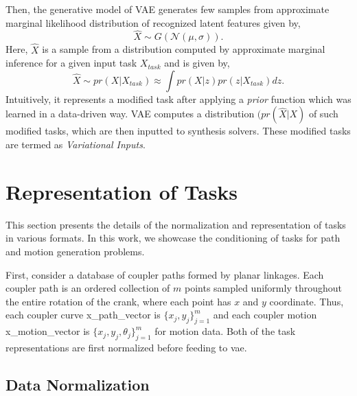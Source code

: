 Then, the generative model of VAE generates few samples from approximate marginal likelihood distribution of recognized latent features given by,
\begin{equation}
  \hat{X} \sim G(\mathcal{N}(\mu, \sigma)).
\end{equation}
Here, $\hat{X}$ is a sample from a distribution computed by approximate marginal inference for a given input task $X_{task}$ and is given by,
\begin{equation}
  \hat{X} \sim pr(X|X_{task}) \approx \int pr(X|z)pr(z|X_{task})dz.
\end{equation}
Intuitively, it represents a modified task after applying a \emph{prior} function which was learned in a data-driven way.
VAE computes a distribution $(pr(\hat{X}|X)$ of such modified tasks, which are then inputted to synthesis solvers. These modified tasks are termed as \emph{Variational Inputs}. 


\section{Representation of Tasks}\label{sec_data_prep}
This section presents the details of the normalization and representation of tasks in various formats. In this work, we showcase the conditioning of tasks for path and motion generation problems.

First, consider a database of coupler paths formed by planar linkages. Each coupler path is an ordered collection of $m$ points sampled uniformly throughout the entire rotation of the crank, where each point has $x$ and $y$ coordinate.
Thus, each coupler curve \ac{x_path_vector} is $\{x_j, y_j\}_{j=1}^{m}$ and each coupler motion \ac{x_motion_vector} is $\{x_j, y_j, \theta_j\}_{j=1}^{m}$ for motion data. Both of the task representations are first normalized before feeding to \ac{vae}.

\subsection{Data Normalization}

